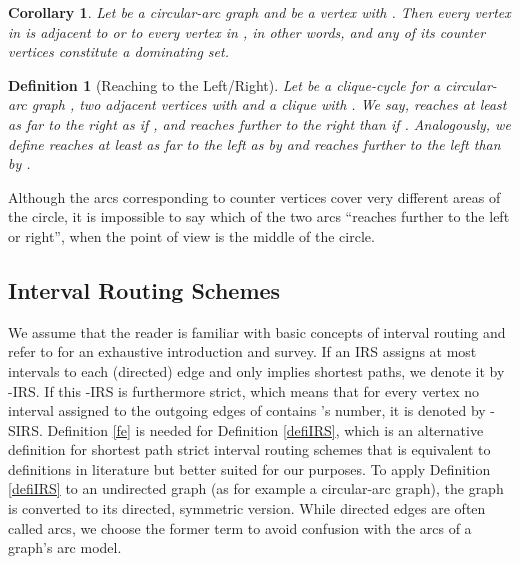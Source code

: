 \documentclass[10pt]{article}
\newtheorem{corollary}[theorem]{Corollary}
\newtheorem{definition}[theorem]{Definition}
\newcommand{\q}[1]{``#1''}\newcommand{\fu}[1]{\mathcal{#1}}\newcommand{\mc}[1]{\mathsf{#1}}\newcommand{\ri}[1]{\mathscr{#1}}\newcommand{\co}[1]{\fu{C}({#1})}\newcommand{\lc}[1]{\alpha(#1)}\newcommand{\rc}[1]{\beta(#1)}\newcommand{\ema}[1]{\mathcal{#1}}\newcommand{\fe}[2]{\fu{F}(#1,#2)}\newcommand{\lv}[1]{l_{#1}}\newcommand{\rv}[1]{r_{#1}}\newcommand{\mv}[1]{m_{#1}}\newcommand{\lvv}{\lv{v}}
\begin{document}
\begin{corollary}\label{adjacentToVorCoV}
Let  be a circular-arc graph and  be a vertex 
with . Then every vertex in  is adjacent 
to  or to every vertex in , in other words,  and 
any of its counter vertices constitute a dominating set.
\end{corollary}



\begin{definition}[Reaching to the Left/Right]\label{defi:reaches}
Let  be a clique-cycle for a circular-arc graph ,  two adjacent vertices with  and  a clique with .
We say, \emph{ reaches at least as 
far to the right as } if , 
and \emph{ reaches further to the right than } 
if .
Analogously, we define \emph{ reaches at least as 
far to the left as } by  
and \emph{ reaches further to the left than } 
by .
\end{definition}

Although the arcs corresponding to counter vertices 
cover very different areas of the circle, it is impossible to say 
which of the two arcs \q{reaches further to the left or right}, when the point of 
view is the middle of the circle.








\subsection{Interval Routing Schemes}\label{IRS}



We assume that the reader is familiar with basic concepts of interval routing and refer to \cite{Gavoille00asurvey} for an exhaustive introduction and survey.
If an IRS assigns at most  intervals to each (directed) edge and only implies shortest paths, we denote it by -IRS.
If this -IRS is furthermore strict, which means that for every vertex  no interval assigned to the outgoing edges of  contains 's number, it is denoted by -SIRS.
Definition \ref{fe} is needed for Definition \ref{defiIRS}, which is an alternative definition for shortest path strict interval routing schemes that is equivalent to definitions in literature but better suited for our purposes.
To apply Definition \ref{defiIRS} to an undirected graph (as for example a circular-arc graph), the graph is converted to its directed, symmetric version.
While directed edges are often called arcs, we choose the former term to avoid confusion with the arcs of a graph's arc model.
\end{document}
